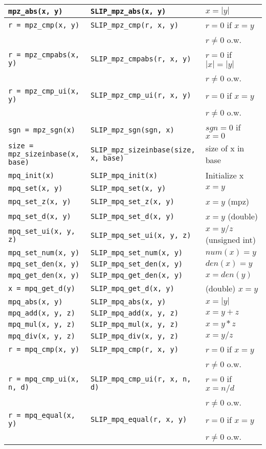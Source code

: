\documentclass[12pt]{article}
\theoremstyle{definition}
\begin{document}
\begin{table*}[htbp]
\begin{center}
\begin{tabular}{|l|l|l|}
\verb|mpz_abs(x, y)| & \verb|SLIP_mpz_abs(x, y)| & $x = |y|$ \\ \hline
\verb|r = mpz_cmp(x, y)| & \verb|SLIP_mpz_cmp(r, x, y)| & $r = 0$ if $x=y$\\&& $r\neq 0$ o.w. \\ \hline
\verb|r = mpz_cmpabs(x, y)| & \verb|SLIP_mpz_cmpabs(r, x, y)| & $r = 0$ if $|x|=|y|$\\&&  $r\neq 0$ o.w.\\ \hline
\verb|r = mpz_cmp_ui(x, y)| & \verb|SLIP_mpz_cmp_ui(r, x, y)| & $r = 0$ if $x=y$\\&&  $r\neq 0$ o.w. \\ \hline
\verb|sgn = mpz_sgn(x)| & \verb|SLIP_mpz_sgn(sgn, x)| & $sgn = 0$ if $x = 0$ \\ \hline
\verb|size = mpz_sizeinbase(x, base)| & \verb|SLIP_mpz_sizeinbase(size, x, base)| & size of x in base \\ \hline
\verb|mpq_init(x)| & \verb|SLIP_mpq_init(x)| & Initialize x \\ \hline
\verb|mpq_set(x, y)| & \verb|SLIP_mpq_set(x, y)| & $x = y$ \\ \hline
\verb|mpq_set_z(x, y)| & \verb|SLIP_mpq_set_z(x, y)| & $x = y$ (mpz) \\ \hline
\verb|mpq_set_d(x, y)| & \verb|SLIP_mpq_set_d(x, y)| & $x=y$ (double) \\ \hline
\verb|mpq_set_ui(x, y, z)| & \verb|SLIP_mpq_set_ui(x, y, z)| & $x = y/z$ (unsigned int) \\ \hline
\verb|mpq_set_num(x, y)| & \verb|SLIP_mpq_set_num(x, y)| & $num(x) = y$ \\ \hline
\verb|mpq_set_den(x, y)| & \verb|SLIP_mpq_set_den(x, y)| & $den(x) = y$ \\ \hline
\verb|mpq_get_den(x, y)| & \verb|SLIP_mpq_get_den(x, y)| & $x = den(y)$ \\ \hline
\verb|x = mpq_get_d(y)| & \verb|SLIP_mpq_get_d(x, y)| & (double) $x = y$ \\ \hline
\verb|mpq_abs(x, y)| & \verb|SLIP_mpq_abs(x, y)| & $x = |y|$ \\ \hline
\verb|mpq_add(x, y, z)| & \verb|SLIP_mpq_add(x, y, z)| & $x = y+z$ \\ \hline
\verb|mpq_mul(x, y, z)| & \verb|SLIP_mpq_mul(x, y, z)| & $x = y*z$ \\ \hline
\verb|mpq_div(x, y, z)| & \verb|SLIP_mpq_div(x, y, z)| & $x = y/z$ \\ \hline
\verb|r = mpq_cmp(x, y)| & \verb|SLIP_mpq_cmp(r, x, y)| & $r = 0$ if $x=y$\\&&  $r\neq 0$ o.w. \\ \hline
\verb|r = mpq_cmp_ui(x, n, d)| & \verb|SLIP_mpq_cmp_ui(r, x, n, d)| & $r = 0$ if $x=n/d$\\&& $r\neq 0$ o.w. \\ \hline
\verb|r = mpq_equal(x, y)| & \verb|SLIP_mpq_equal(r, x, y)| & $r = 0$ if $x=y$\\&&  $r\neq 0$ o.w. \\ \hline
\end{tabular}
\end{center}
\end{table*}
\newpage
\end{document}
